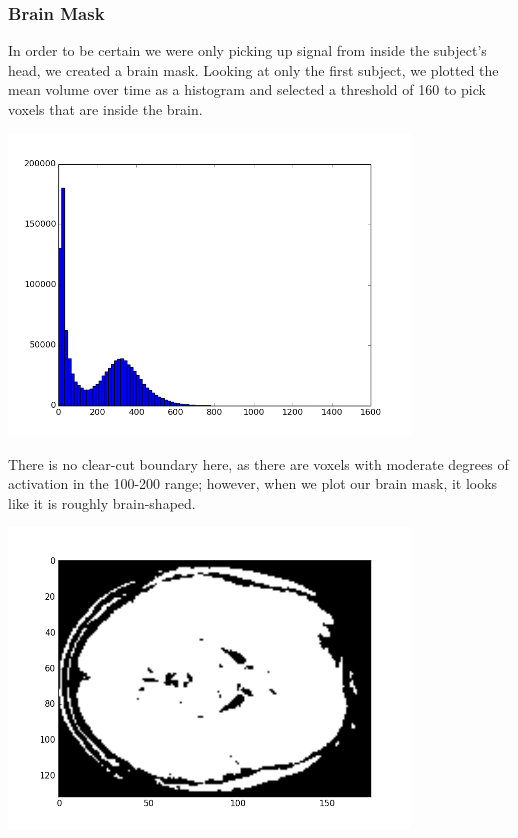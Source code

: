 \documentclass[11pt]{article}
\begin{document}
\subsubsection{Brain Mask}
In order to be certain we were only picking up signal from inside the subject's
head, we created a brain mask.  Looking at only the first subject, we plotted 
the mean volume over time as a histogram and selected a threshold 
of 160 to pick voxels that are inside the brain.  
\begin{center}                                                                  
\includegraphics[height=8cm]{subj_1_vol_mean_histogram.png}         
\end{center} 
There is no clear-cut boundary here, as there are voxels with moderate degrees of activation in the 100-200 range; however, when we plot our brain mask, it 
looks like it is roughly brain-shaped.
\begin{center}                                                                  
\includegraphics[height=8cm]{brain_mask.png}         
\end{center} 
\end{document}
